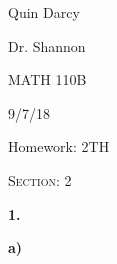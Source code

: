 \documentclass[12pt, a4paper]{article}
\begin{document}
  
 \begin{flushleft}
  
    Quin Darcy\par
    Dr. Shannon\par
    MATH 110B\par
    9/7/18
  
 \end{flushleft}
  
 \centerline{Homework: 2TH}
 
 \vspace{4mm}
 
 \noindent\textsc{Section: 2}\par
 
 \justifying
 
 \vspace{1mm}
 
 \hline
 
 \vspace{4mm}
 
 \noindent\textbf{1.}\par
 
 \vspace{4mm}
 
 \par\textbf{a)} 
 
 \vspace{2mm}
 
\end{document}
